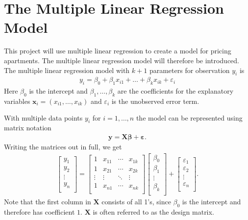 \section{The Multiple Linear Regression Model}
This project will use multiple linear regression to create a model for pricing apartments. The multiple linear regression model will therefore be introduced. The multiple linear regression model with $k+1$ parameters for observation $y_i$ is
\begin{align}\label{eq:multiple_linear_regression}
  y_i = \beta_0 + \beta_1 x_{i1} + \ldots + \beta_k x_{ik} + \varepsilon_i
\end{align}
Here $\beta_0$ is the intercept and $\beta_1, \ldots, \beta_k$ are the coefficients for the explanatory variables $\textbf{x}_i = (x_{i1}, \ldots, x_{ik})$ and $\varepsilon_i$ is the unobserved error term.

With multiple data points $y_i$ for $i = 1, \ldots, n$ the model can be represented using matrix notation
\begin{align}\label{eq:multiple_linear_regression_model}
    \mathbf{y} = \mathbf{X} \boldsymbol{\beta} + \boldsymbol{\varepsilon}.
\end{align}
Writing the matrices out in full, we get
\begin{align}
  \begin{bmatrix}
    y_1 \\ y_2 \\ \vdots \\ y_n \\
  \end{bmatrix}
  =
  \begin{bmatrix}
    1 & x_{11} & \cdots & x_{1k} \\
    1 & x_{21} & \cdots & x_{2k} \\ \vdots & \vdots & \ddots & \vdots \\ 1 & x_{n1} & \cdots & x_{nk} \\
  \end{bmatrix}
  \begin{bmatrix}
    \beta_0 \\ \beta_1 \\ \vdots \\ \beta_k \\
  \end{bmatrix} +
  \begin{bmatrix}
    \varepsilon_1 \\ \varepsilon_2 \\ \vdots \\ \varepsilon_n \\
  \end{bmatrix}.
\end{align}
Note that the first column  in $\boldsymbol{X}$ consists of all 1's, since $\beta_{0}$ is the intercept and therefore has coefficient $1$. $\textbf{X}$ is often referred to as the design matrix. 

